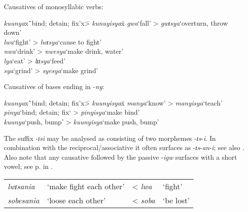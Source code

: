 \begin{exe}
\ex\begin{xlist}
\ex \label{exCaus2MonoPalatal}Causatives of monosyllabic verbs:
\begin{tabbing}
\textit{kuunya}x\=`bind; detain; fix'x\= > \textit{kunuyisya}x\=\kill%
\textit{gwa}\>`fall'\> > \textit{gwɪsya}\>`overturn, throw down'\\
\textit{lwa}\>`fight'\> > \textit{lwɪsya}\>`cause to fight'\\
\textit{nwa}\>`drink'\> > \textit{nwesya}\>`make drink, water'\\
\textit{lya}\>`eat'\> > \textit{lɪɪsya}\>`feed'\\
\textit{sya}\>`grind'\> > \textit{syesya}\>`make grind'%
\end{tabbing}
\ex Causatives of bases ending in -\textit{ny}:
\begin{tabbing}
\textit{kuunya}x\=`bind; detain; fix'x\= > \textit{kuunyisya}x\=\kill%
\textit{manya}\>`know'\> > \textit{manyisya}\>`teach'\\
\textit{pinya}\>`bind; detain; fix`\> > \textit{pinyisya}\>`make bind'\\
\textit{kuunya}\>`push, bump'\> > \textit{kuunyisya}\>`make push, bump'
\end{tabbing}
\end{xlist}
\end{exe}

The suffix -\textit{ɪsi} may be analysed as consisting of two morphemes -\textit{ɪs}-\textit{i}. In combination with the reciprocal/associative it often surfaces as -\textit{ɪs}-\textit{an}-\textit{i}; see also . Also note that any causative followed by the passive \mbox{-\textit{igw}} surfaces with a short vowel; see p.\nobreakspace\pageref{exCausativePassiveShortVowel} in .
\begin{exe}
\ex
\begin{tabular}[t]{llll}
\textit{lwɪsania}&`make fight each other'& < \textit{lwa}&`fight'\\
\textit{sobesania}&`loose each other'& < \textit{soba} & \lq be lost'
\end{tabular}
\end{exe}

